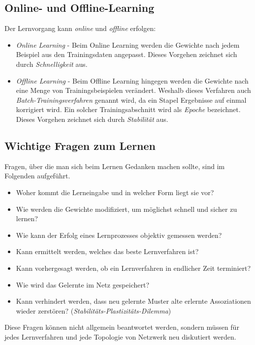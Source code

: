 \subsection*{Online- und Offline-Learning}
Der Lernvorgang kann \emph{online} und \emph{offline} erfolgen:
\begin{itemize}
	\item \emph{Online Learning} - Beim Online Learning werden die Gewichte nach jedem Beispiel aus den Trainingsdaten angepasst. Dieses Vorgehen zeichnet sich durch \emph{Schnelligkeit} aus.
	\item \emph{Offline Learning} - Beim Offline Learning hingegen werden die Gewichte nach eine Menge von Trainingsbeispielen verändert. Weshalb dieses Verfahren auch \emph{Batch-Trainingsverfahren} genannt wird, da ein Stapel Ergebnisse auf einmal korrigiert wird. Ein solcher Trainingsabschnitt wird als \emph{Epoche} bezeichnet. Dieses Vorgehen zeichnet sich durch \emph{Stabilität} aus.
\end{itemize}

\subsection*{Wichtige Fragen zum Lernen}
Fragen, über die man sich beim Lernen Gedanken machen sollte, sind im Folgenden aufgeführt.
\begin{itemize}
	\item Woher kommt die Lerneingabe und in welcher Form liegt sie vor?
	\item Wie werden die Gewichte modifiziert, um möglichst schnell und sicher zu lernen?
	\item Wie kann der Erfolg eines Lernprozesses objektiv gemessen werden?
	\item Kann ermittelt werden, welches das beste Lernverfahren ist?
	\item Kann vorhergesagt werden, ob ein Lernverfahren in endlicher Zeit terminiert?
	\item Wie wird das Gelernte im Netz gespeichert?
	\item Kann verhindert werden, dass neu gelernte Muster alte erlernte Assoziationen wieder zerstören? (\emph{Stabilitäts-Plastizitäts-Dilemma})
\end{itemize}
Diese Fragen können nicht allgemein beantwortet werden, sondern müssen für jedes Lernverfahren und jede Topologie von Netzwerk neu diskutiert werden.




